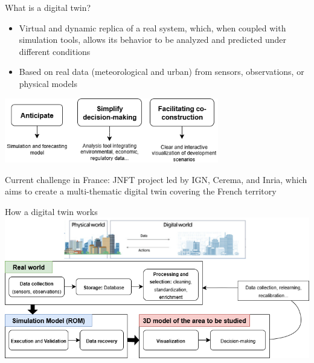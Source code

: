\documentclass{beamer}
\begin{document}
\begin{frame}{What is a digital twin?}
    \small
    \begin{itemize}
        \item Virtual and dynamic replica of a real system, which, when coupled with simulation tools, allows its behavior to be analyzed and predicted under different conditions
        \item Based on real data (meteorological and urban) from sensors, observations, or physical models
    \end{itemize}
    \begin{center}
        \includegraphics[width=0.7\textwidth]{images/objectifs_jm.png} \\
    \end{center}
    Current challenge in France: JNFT project led by IGN, Cerema, and Inria, which aims to create a multi-thematic digital twin covering the French territory
\end{frame}


\begin{frame}{How a digital twin works} %
    \hspace*{-0.5cm}
    \includegraphics[width=1.1\textwidth]{images/pipeline.png} \\
\end{frame}
\end{document}
